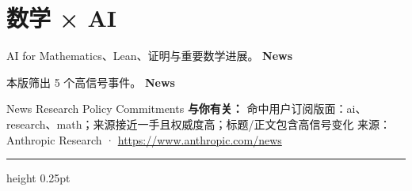 \documentclass[10.5pt]{ctexart}
\begin{document}
\section*{数学 × AI}
{\color{ormuted} AI for Mathematics、Lean、证明与重要数学进展。}
\vspace{2mm}
{\LARGE\bfseries News}\par
\vspace{1mm}
{\color{ormuted} 本版筛出 5 个高信号事件。}
\vspace{3mm}
{\Large\bfseries News}\par
News Research Policy Commitments
\textbf{与你有关：} 命中用户订阅版面：ai、research、math；来源接近一手且权威度高；标题/正文包含高信号变化
{\footnotesize\color{ormuted} 来源：Anthropic Research · \url{https://www.anthropic.com/news}}
\vspace{4mm}
\hrule height 0.25pt
\vspace{3mm}
\end{document}
